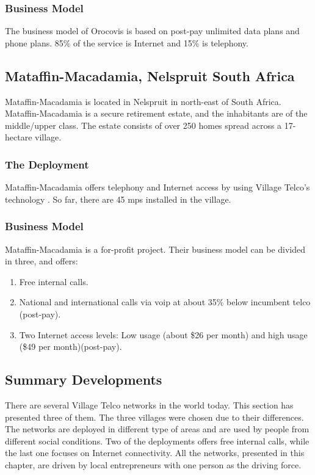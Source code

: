 \subsubsection{Business Model}
The business model of Orocovis is based on post-pay unlimited data plans and phone plans. 85\% of the service is Internet and 15\% is telephony. 

\subsection{Mataffin-Macadamia, Nelspruit South Africa}
Mataffin-Macadamia is located in Nelspruit in north-east of South Africa. Mataffin-Macadamia is a secure retirement estate, and the inhabitants are of the middle/upper class. The estate consists of over 250 homes spread across a 17-hectare village. 

\subsubsection{The Deployment}
Mataffin-Macadamia offers telephony and Internet access by using Village Telco's technology \cite{mataffinict}. So far, there are 45 \glspl{mp} installed in the village.

\subsubsection{Business Model}
Mataffin-Macadamia is a for-profit project. Their business model can be divided in three, and offers: 
\begin{enumerate}
\item Free internal calls.
\item National and international calls via \gls{voip} at about 35\% below incumbent telco (post-pay).
\item Two Internet access levels: Low usage (about \$26 per month) and high usage (\$49 per month)(post-pay).
\end{enumerate}

\subsection{Summary Developments}
There are several Village Telco networks in the world today. This section has presented three of them. The three villages were chosen due to their differences. The networks are deployed in different type of areas and are used by people from different social conditions. Two of the deployments offers free internal calls, while the last one focuses on Internet connectivity. All the networks, presented in this chapter, are driven by local entrepreneurs with one person as the driving force.

